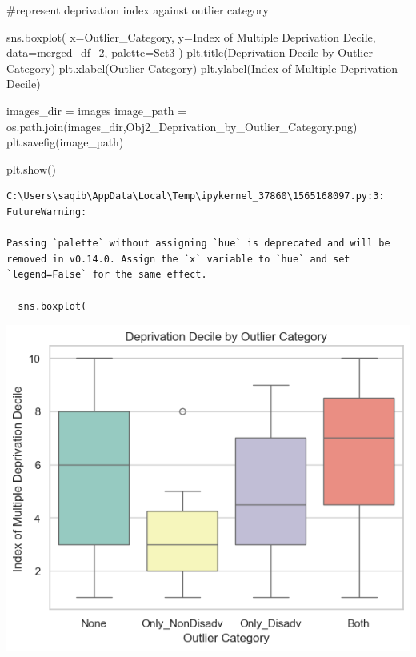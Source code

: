 \documentclass[
  letterpaper,
  DIV=11,
  numbers=noendperiod]{scrartcl}
\newenvironment{Shaded}{\begin{snugshade}}{\end{snugshade}}
\newcommand{\CommentTok}[1]{\textcolor[rgb]{0.37,0.37,0.37}{#1}}
\newcommand{\NormalTok}[1]{\textcolor[rgb]{0.00,0.23,0.31}{#1}}
\newcommand{\OperatorTok}[1]{\textcolor[rgb]{0.37,0.37,0.37}{#1}}
\newcommand{\StringTok}[1]{\textcolor[rgb]{0.13,0.47,0.30}{#1}}
\begin{document}
\begin{Shaded}
\begin{Highlighting}[]
\CommentTok{\#represent deprivation index against outlier category }

\NormalTok{sns.boxplot(}
\NormalTok{    x}\OperatorTok{=}\StringTok{\textquotesingle{}Outlier\_Category\textquotesingle{}}\NormalTok{, }
\NormalTok{    y}\OperatorTok{=}\StringTok{\textquotesingle{}Index of Multiple Deprivation Decile\textquotesingle{}}\NormalTok{, }
\NormalTok{    data}\OperatorTok{=}\NormalTok{merged\_df\_2, }
\NormalTok{    palette}\OperatorTok{=}\StringTok{\textquotesingle{}Set3\textquotesingle{}}
\NormalTok{)}
\NormalTok{plt.title(}\StringTok{\textquotesingle{}Deprivation Decile by Outlier Category\textquotesingle{}}\NormalTok{)}
\NormalTok{plt.xlabel(}\StringTok{\textquotesingle{}Outlier Category\textquotesingle{}}\NormalTok{)}
\NormalTok{plt.ylabel(}\StringTok{\textquotesingle{}Index of Multiple Deprivation Decile\textquotesingle{}}\NormalTok{)}

\NormalTok{images\_dir }\OperatorTok{=} \StringTok{\textquotesingle{}images\textquotesingle{}}
\NormalTok{image\_path }\OperatorTok{=}\NormalTok{ os.path.join(images\_dir,}\StringTok{\textquotesingle{}Obj2\_Deprivation\_by\_Outlier\_Category.png\textquotesingle{}}\NormalTok{)}
\NormalTok{plt.savefig(image\_path)}

\NormalTok{plt.show()}

\end{Highlighting}
\end{Shaded}

\begin{verbatim}
C:\Users\saqib\AppData\Local\Temp\ipykernel_37860\1565168097.py:3: FutureWarning: 

Passing `palette` without assigning `hue` is deprecated and will be removed in v0.14.0. Assign the `x` variable to `hue` and set `legend=False` for the same effect.

  sns.boxplot(
\end{verbatim}

\includegraphics{P4DS_A2_Data_Analysis_Project_files/figure-pdf/cell-78-output-2.png}
\end{document}
